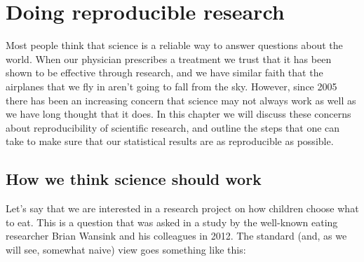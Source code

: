 \documentclass[12pt,]{book}
\theoremstyle{definition}
\theoremstyle{definition}
\theoremstyle{definition}
\theoremstyle{remark}
\begin{document}
\hypertarget{doing-reproducible-research}{%
\chapter{Doing reproducible research}\label{doing-reproducible-research}}

Most people think that science is a reliable way to answer questions about the world. When our physician prescribes a treatment we trust that it has been shown to be effective through research, and we have similar faith that the airplanes that we fly in aren't going to fall from the sky. However, since 2005 there has been an increasing concern that science may not always work as well as we have long thought that it does. In this chapter we will discuss these concerns about reproducibility of scientific research, and outline the steps that one can take to make sure that our statistical results are as reproducible as possible.

\hypertarget{how-we-think-science-should-work}{%
\section{How we think science should work}\label{how-we-think-science-should-work}}

Let's say that we are interested in a research project on how children choose what to eat. This is a question that was asked in a study by the well-known eating researcher Brian Wansink and his colleagues in 2012. The standard (and, as we will see, somewhat naive) view goes something like this:
\end{document}
